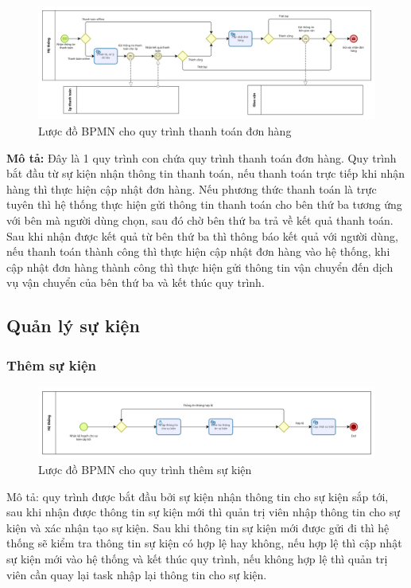\begin{figure}[!htp]
	\centering
	\includegraphics[width=15cm]{img/BPMN/customer_buy/customer_payment.png}
	\newline
	\caption{Lược đồ BPMN cho quy trình thanh toán đơn hàng}
\end{figure}
\textbf{Mô tả:} Đây là 1 quy trình con chứa quy trình thanh toán đơn hàng. Quy trình bắt đầu từ sự kiện nhận thông tin thanh toán, nếu thanh toán trực tiếp khi nhận hàng thì thực hiện cập nhật đơn hàng. Nếu phương thức thanh toán là trực tuyên thì hệ thống thực hiện gửi thông tin thanh toán cho bên thứ ba tương ứng với bên mà người dùng chọn, sau đó chờ bên thứ ba trả về kết quả thanh toán. Sau khi nhận được kết quả từ bên thứ ba thì thông báo kết quả với người dùng, nếu thanh toán thành công thì thực hiện cập nhật đơn hàng vào hệ thống, khi cập nhật đơn hàng thành công thì thực hiện gửi thông tin vận chuyển đến dịch vụ vận chuyển của bên thứ ba và kết thúc quy trình.


\newpage


\subsection{Quản lý sự kiện}

\subsubsection{Thêm sự kiện}

\begin{figure}[!htp]
	\centering
	\includegraphics[width=14cm]{img/BPMN/event/add_event.png}
	\newline
	\caption{Lược đồ BPMN cho quy trình thêm sự kiện}
\end{figure}
Mô tả: quy trình được bắt đầu bởi sự kiện nhận thông tin cho sự kiện sắp tới, sau khi nhận được thông tin sự kiện mới thì quản trị viên nhập thông tin cho sự kiện và xác nhận tạo sự kiện. Sau khi thông tin sự kiện mới được gửi đi thì hệ thống sẽ kiểm tra thông tin sự kiện có hợp lệ hay không, nếu hợp lệ thì cập nhật sự kiện mới vào hệ thống và kết thúc quy trình, nếu không hợp lệ thì quản trị viên cần quay lại task nhập lại thông tin cho sự kiện.

